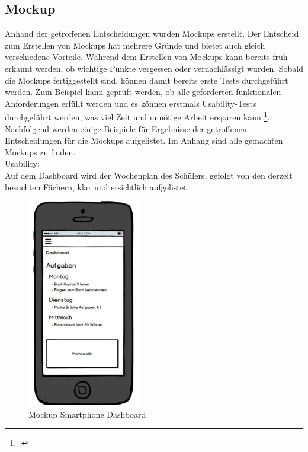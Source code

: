 \subsection{Mockup}
Anhand der getroffenen Entscheidungen wurden Mockups erstellt. Der Entscheid zum Erstellen von Mockups hat mehrere Gründe und bietet auch gleich verschiedene Vorteile. Während dem Erstellen von Mockups kann bereits früh erkannt werden, ob wichtige Punkte vergessen oder vernachlässigt wurden. Sobald die Mockups fertiggestellt sind, können damit bereits erste Tests durchgeführt werden. Zum Beispiel kann geprüft werden, ob alle geforderten funktionalen Anforderungen erfüllt werden und es können erstmals Usability-Tests durchgeführt werden, was viel Zeit und unnötige Arbeit ersparen kann \footcite{mockups}. \\

Nachfolgend werden einige Beispiele für Ergebnisse der getroffenen Entscheidungen für die Mockups aufgelistet. Im Anhang sind alle gemachten Mockups zu finden. \\ %

Usability: \\
Auf dem Dashboard wird der Wochenplan des Schülers, gefolgt von den derzeit besuchten Fächern, klar und ersichtlich aufgelistet. \\
\begin{minipage}{\textwidth}
	\begin{figure}[H]
	\centering
		\includegraphics[width=5cm, keepaspectratio]{images/Mockups/Dashboard_Smartphone.png}
		\caption{Mockup Smartphone Dashboard}
	\end{figure}
\end{minipage}


